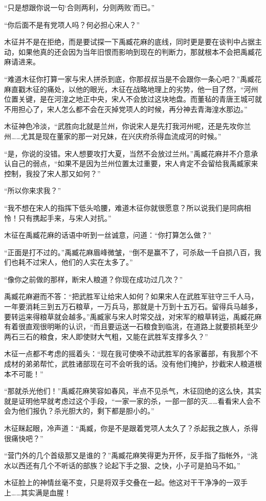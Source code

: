“只是想跟你说一句‘合则两利，分则两败’而已。”

“你后面不是有党项人吗？何必担心宋人？”

木征并不是在拒绝，而是要试探一下禹臧花麻的底线，同时更是要在谈判中占据主动，如果他真的还会因为当年旧恨而影响到现在的判断力，那就根本不会把禹臧花麻请进来。

“难道木征你打算一家与宋人拼杀到底，你那叔叔当是不会跟你一条心吧？”禹臧花麻直戳木征的痛处，以他的眼光，木征在战略地理上的劣势，他一目了然，“河州位置关键，是在河湟之地正中央，宋人不会放过这块地盘。而董毡的青唐王城可就不用担心了，宋人怎么都不会在灭掉党项人的时候，再分神去青海湟水那边。”

木征神色冷淡，“武胜向北就是兰州，你说宋人是先打我河州呢，还是先攻你兰州……尤其是现在董家的那一对兄妹，在兴庆府杀得血流成河的时候。”

“是，你说的没错。宋人想要攻打大夏，当然不会放过兰州。”禹臧花麻并不介意承认自己的弱点，“如果不是因为兰州位置太过重要，宋人肯定不会留给我禹臧家来控制，我投了宋人那又如何？”

“所以你来求我？”

“我不想在宋人的指挥下低头哈腰，难道木征你就很愿意？所以说我们是同病相怜！只有携起手来，与宋人对抗。”

木征在禹臧花麻的话语中听到一丝诚意，问道：“你打算怎么做？”

“正面是打不过的。”禹臧花麻眉峰微皱，“倒不是赢不了，可杀敌一千自损八百，我们也耗不过宋人，他们的人实在太多了。”

“像你之前做的那样，断宋人粮道？你现在成功过几次？”

禹臧花麻避而不答：“把武胜军让给宋人如何？如果宋人在武胜军驻守三千人马，一年要消耗三到五万石粮草，一万兵马，那就是十万到十五万石。留得兵马越多，要转运来得粮草就会越多。”禹臧家与宋人时常交战，对宋军的粮草转运，禹臧花麻有着很直观很明晰的认识，“而且要运送一石粮食到临洮，在道路上就要损耗至少两石三石的粮食，宋人即使财大气粗，又能在武胜军支撑多久？”

木征一点都不考虑的摇着头：“现在我可使唤不动武胜军的各家蕃部，有我那个不成材的弟弟帮忙，武胜诸部现在可不会听我的话。没有他们掩护，抄截宋人粮道根本不可能！”

“那就杀光他们！”禹臧花麻笑容如春风，半点不见杀气，木征回绝的这么快，其实就是证明他早就考虑过这个手段，“一家一家的杀，一部一部的灭……看看宋人会不会为他们报仇？杀光胆大的，剩下都是胆小的。”

木征眯起眼，冷声道：“禹臧，你是不是跟着党项人太久了？杀起我之族人，杀得很痛快吧？”

“营门外的几个首级那又是谁的？”禹臧花麻笑得更为开怀，反手指了指帐外，“洮水以西还有几个不听话的部族？论起下手之狠、之快，小子可是拍马不如。”

木征脸上的神情丝毫不变，只是将双手交叠在一起。他这对干干净净的一双手上……其实满是血腥！

